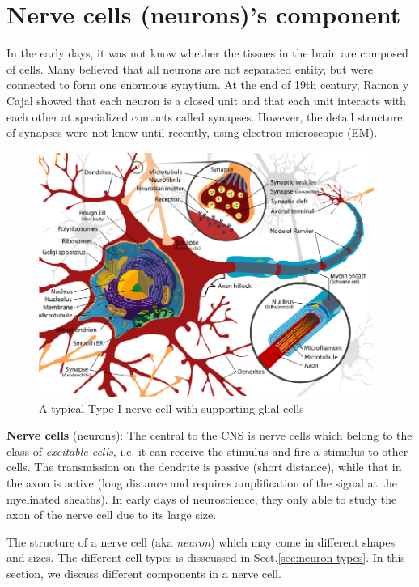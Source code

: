 \chapter{Nerve cells (neurons)'s component}
\label{sec:nerve-cells}

In the early days, it was not know whether the tissues in the brain are composed
of cells. Many believed that all neurons are not separated entity, but were
connected to form one enormous synytium. At the end of 19th century, Ramon y
Cajal showed that each neuron is a closed unit and that each unit interacts with
each other at specialized contacts called synapses. However, the detail
structure of synapses were not know until recently, using electron-microscopic
(EM).

\begin{figure}[htb]
\centerline{\includegraphics[height=8cm]{./images/Complete_neuron_cell_diagram.eps}}
\caption{A typical Type I nerve cell with supporting glial cells}\label{fig:neuron}
\end{figure} 


{\bf Nerve cells} (neurons): The central to the CNS is nerve cells which belong
to the class of {\it excitable cells}, i.e. it can receive the stimulus and fire
a stimulus to other cells.
The transmission on the dendrite is passive (short distance), while that in the
axon is active (long distance and requires amplification of the signal at the
myelinated sheaths).
In early days of neuroscience, they only able to study the axon of the nerve
cell due to its large size. \citep{hodgkin1948} 


The structure of a nerve cell (aka {\it neuron}) which may come in different
shapes and sizes. The different cell types is disscussed in
Sect.\ref{sec:neuron-types}. In this section, we discuss different components in
a nerve cell.

